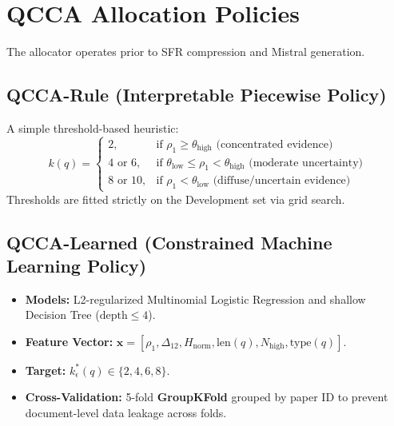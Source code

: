 \documentclass[11pt,a4paper]{article}
\begin{document}
\section{QCCA Allocation Policies}
The allocator operates prior to SFR compression and Mistral generation.

\subsection{QCCA-Rule (Interpretable Piecewise Policy)}
A simple threshold-based heuristic:
\begin{equation*}
k(q) = \begin{cases}
2, & \text{if } \rho_1 \ge \theta_{\text{high}} \text{ (concentrated evidence)} \\
4 \text{ or } 6, & \text{if } \theta_{\text{low}} \le \rho_1 < \theta_{\text{high}} \text{ (moderate uncertainty)} \\
8 \text{ or } 10, & \text{if } \rho_1 < \theta_{\text{low}} \text{ (diffuse/uncertain evidence)}
\end{cases}
\end{equation*}
Thresholds are fitted strictly on the Development set via grid search.

\subsection{QCCA-Learned (Constrained Machine Learning Policy)}
\begin{itemize}
    \item \textbf{Models:} L2-regularized Multinomial Logistic Regression and shallow Decision Tree ($\text{depth} \le 4$).
    \item \textbf{Feature Vector:} $\mathbf{x} = [\rho_1, \Delta_{12}, H_{\text{norm}}, \text{len}(q), N_{\text{high}}, \text{type}(q)]$.
    \item \textbf{Target:} $k^*_{\epsilon}(q) \in \{2, 4, 6, 8\}$.
    \item \textbf{Cross-Validation:} 5-fold \textbf{GroupKFold} grouped by paper ID to prevent document-level data leakage across folds.
\end{itemize}
\end{document}
